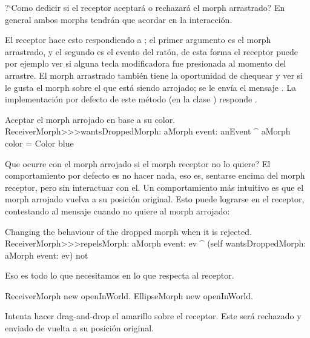 \documentclass[a4paper,10pt,twoside]{book}
\begin{document}
?`Como dedicir si el receptor aceptar\'a o rechazar\'a el morph arrastrado?
En general ambos morphs tendr\'an que acordar en la interacci\'on.

El receptor hace esto respondiendo a ; el primer argumento es el morph arrastrado, y el segundo es el evento del rat\'on, de esta forma el receptor puede por ejemplo ver si alguna tecla modificadora fue presionada al momento del arrastre.
El morph arrastrado tambi\'en tiene la oportunidad de chequear y ver si le gusta el morph sobre el que está siendo arrojado; se le env\'ia el mensaje . La implementaci\'on por defecto de este m\'etodo (en la clase ) responde .

\begin{method}{Aceptar el morph arrojado en base a su color.}
ReceiverMorph>>>wantsDroppedMorph: aMorph event: anEvent
	^ aMorph color = Color blue
\end{method}

Que ocurre con el morph arrojado si el morph receptor no lo quiere? El comportamiento por defecto es no hacer nada, eso es, sentarse encima del  morph receptor, pero sin interactuar con el. Un comportamiento m\'as intuitivo es que el morph arrojado vuelva a su posici\'on original. Esto puede lograrse en el receptor, contestando   al mensaje  cuando no quiere al morph arrojado:


\begin{method}{Changing the behaviour of the dropped morph when it is rejected.}
ReceiverMorph>>>repelsMorph: aMorph event: ev
	^ (self wantsDroppedMorph: aMorph event: ev) not
\end{method}

Eso es todo lo que necesitamos en lo que respecta al receptor.

\begin{code}{}
ReceiverMorph new openInWorld.
EllipseMorph new openInWorld.
\end{code}
\noindent
Intenta hacer drag-and-drop  el   amarillo sobre el receptor. Este ser\'a rechazado y enviado de vuelta a su posici\'on original.

\end{document}
